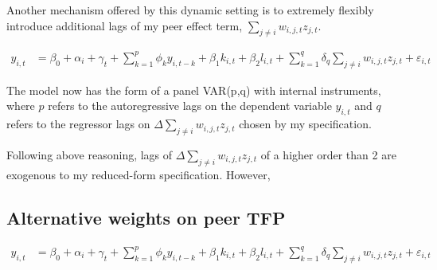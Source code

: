 Another mechanism offered by this dynamic setting is
to extremely flexibly introduce additional lags of my peer effect term,
$\sum_{j\neq i} w_{i,j,t}z_{j,t}$.

\begin{align}
    y_{i,t} &= \beta_0 + \alpha_i + \gamma_t
                + \sum_{k=1}^p \phi_k y_{i,t-k}
                + \beta_1 k_{i,t}
                + \beta_2 l_{i,t}
                + \sum_{k=1}^q \delta_q \sum_{j\neq i} w_{i,j,t}z_{j,t}
                + \varepsilon_{i,t}
\end{align}

The model now has the form of a panel VAR(p,q) with internal instruments,
where $p$ refers to the autoregressive lags on the dependent variable $y_{i,t}$
and $q$ refers to the regressor lags on $\Delta\sum_{j\neq i} w_{i,j,t}z_{j,t}$
chosen by my specification.
\par
Following above reasoning, lags of $\Delta\sum_{j\neq i} w_{i,j,t}z_{j,t}$
of a higher order than 2 are exogenous to my reduced-form specification.
However, 

\subsection{Alternative weights on peer TFP}

\begin{align}
    y_{i,t} &= \beta_0 + \alpha_i + \gamma_t
                + \sum_{k=1}^p \phi_k y_{i,t-k}
                + \beta_1 k_{i,t}
                + \beta_2 l_{i,t}
                + \sum_{k=1}^q \delta_q \sum_{j\neq i} w_{i,j,t}z_{j,t}
                + \varepsilon_{i,t}
\end{align}